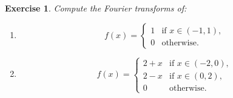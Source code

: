 \documentclass{article}
\newtheorem{ex}{Exercise}
\theoremstyle{nonumberplain}
\begin{document}
\begin{ex}
Compute the Fourier transforms of:
\begin{enumerate}
\item \begin{equation}
f(x) = \begin{cases}
1 & \text{if $x \in (-1,1)$},\\
0 & \text{otherwise.}
\end{cases}
\end{equation}
\item \begin{equation}
f(x) = \begin{cases}
2+x & \text{if $x \in (-2,0)$},\\
2-x & \text{if $x \in (0,2)$},\\
0 & \text{otherwise.}
\end{cases}
\end{equation}
\end{enumerate}
\end{ex}
\end{document}
